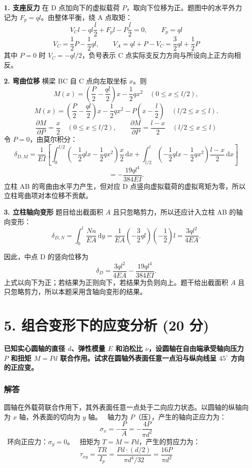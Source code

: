 \documentclass[11pt,a4paper]{ctexrep}
\newcommand{\diff}{\,\mathrm{d}}
\begin{document}
{\textbf{1. 支座反力}
在 D 点加向下的虚拟载荷 $P$，取向下位移为正。题图中的水平外力记为 $F_p=ql$。由整体平衡，绕 A 点取矩：
\[
V_C l-q l\frac{l}{2}+F_p l-P\frac{l}{2}=0,\qquad F_p=ql
\]
\[
V_C=\frac{1}{2}P-\frac{1}{2}ql,\qquad
V_A=ql+P-V_C=\frac{3}{2}ql+\frac{1}{2}P
\]
其中 $P=0$ 时 $V_C=-ql/2$，负号表示 C 点实际支反力方向与所设向上正方向相反。

\textbf{2. 弯曲位移}
横梁 BC 自 C 点向左取坐标 $x$。则
\[
M(x)=\left(\frac{P}{2}-\frac{ql}{2}\right)x-\frac{1}{2}qx^2\quad(0\le x\le l/2),
\]
\[
M(x)=\left(\frac{P}{2}-\frac{ql}{2}\right)x-\frac{1}{2}qx^2-P\left(x-\frac{l}{2}\right)\quad(l/2\le x\le l).
\]
\[
\frac{\partial M}{\partial P}=\frac{x}{2}\quad(0\le x\le l/2),\qquad
\frac{\partial M}{\partial P}=\frac{l-x}{2}\quad(l/2\le x\le l)
\]
令 $P=0$，由莫尔积分：
\[
\delta_{D,M}
=\frac{1}{EI}\left[
\int_0^{l/2}\left(-\frac{1}{2}qlx-\frac{1}{2}qx^2\right)\frac{x}{2}\diff x
+\int_{l/2}^{l}\left(-\frac{1}{2}qlx-\frac{1}{2}qx^2\right)\frac{l-x}{2}\diff x
\right]
\]
\[
=-\frac{19ql^4}{384EI}.
\]
立柱 AB 的弯曲由水平力产生，但对应 D 点竖向虚拟载荷的虚拟弯矩为零，所以立柱弯曲项对本位移不贡献。

\textbf{3. 立柱轴向变形}
题目给出截面积 $A$ 且只忽略剪力，所以还应计入立柱 AB 的轴向变形：
\[
\delta_{D,N}=\int_0^l \frac{Nn}{EA}\diff y
=\frac{1}{EA}\left(-\frac{3}{2}ql\right)\left(-\frac{1}{2}\right)l
=\frac{3ql^2}{4EA}.
\]

因此，中点 D 的竖向位移为
\[
\delta_D=\frac{3ql^2}{4EA}-\frac{19ql^4}{384EI}.
\]
上式以向下为正；若结果为正则向下，若结果为负则向上。题干给出截面积 $A$ 且只忽略剪力，所以本题采用含轴向变形的结果。




\section*{5. 组合变形下的应变分析 (20 分)}

\textbf{已知实心圆轴的直径 $d$、弹性模量 $E$ 和泊松比 $\nu$，设圆轴在自由端承受轴向压力 $P$ 和扭矩 $M = Pd$ 联合作用。试求在圆轴外表面任意一点沿与纵向线呈 $45^\circ$ 方向的正应变。}

\subsubsection*{解答}

圆轴在外载荷联合作用下，其外表面任意一点处于二向应力状态。以圆轴的纵轴向为 $x$ 轴，外表面的切向为 $y$ 轴。
\noindent\textbullet\ 轴力为 $P$（压），产生的轴向正应力为：
  \[
  \sigma_x = -\frac{P}{A} = -\frac{4P}{\pi d^2}
  \]
\noindent\textbullet\ 环向正应力：$\sigma_y = 0$。
\noindent\textbullet\ 扭矩为 $T = M = Pd$，产生的剪应力为：
  \[
  \tau_{xy} = \frac{T R}{I_p} = \frac{Pd \cdot (d/2)}{\pi d^4 / 32} = \frac{16P}{\pi d^2}
  \]

}
\end{document}

